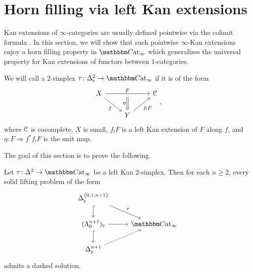 \documentclass[main.tex]{subfiles}
\begin{document}
\section{Horn filling via left Kan extensions}
\label{sec:horn_filling_via_left_kan_extensions}

Kan extensions of $\infty$-categories are usually defined pointwise via the colimit formula \cite{highertopostheory} \cite{cisinski2019higher}. In this section, we will show that such pointwise $\infty$-Kan extensions enjoy a horn filling property in $\ICCat$ which generalizes the universal property for Kan extensions of functors between $1$-categories.

\begin{definition}
  \label{def:left_kan}
  We will call a $2$-simplex $\tau\colon \Delta^{2}_{\flat} \to \ICCat$  if it is of the form
  \begin{equation*}
    \begin{tikzcd}
      X
      \arrow[dr, swap, "f"]
      \arrow[rr, "F", ""{below, name=M}]
      && \category{C}
      \\
      & Y
      \arrow[ur, swap, "f_{!}F"]
      \arrow[from=M, Rightarrow, swap, "\eta"]
    \end{tikzcd},
  \end{equation*}
where $\mathcal{C}$ is cocomplete, $X$ is small, $f_{!}F$ is a left Kan extension of $F$ along $f$, and $\eta\colon F \Rightarrow f^{*}f_{!}F$ is the unit map.
\end{definition}

The goal of this section is to prove the following.

\begin{theorem}
  \label{thm:left_kan_implies_globally_left_kan}
  Let $\tau\colon \Delta^{2} \to \ICCat$ be a left Kan 2-simplex. Then for each $n \geq 2$, every solid lifting problem of the form
  \begin{equation}
    \label{eq:lifting_problems_for_global_kan_extensions}
    \begin{tikzcd}
      \Delta^{\{0,1,n+1\}}_{\flat}
      \arrow[d, hook]
      \arrow[dr, "\tau"]
      \\
      (\Lambda^{n+1}_{0})_{\flat}
      \arrow[r]
      \arrow[d, hook]
      & \ICCat
      \\
      \Delta^{n+1}_{\flat}
      \arrow[ur, dashed]
    \end{tikzcd}
  \end{equation}
  admits a dashed solution.
\end{theorem}
\end{document}
